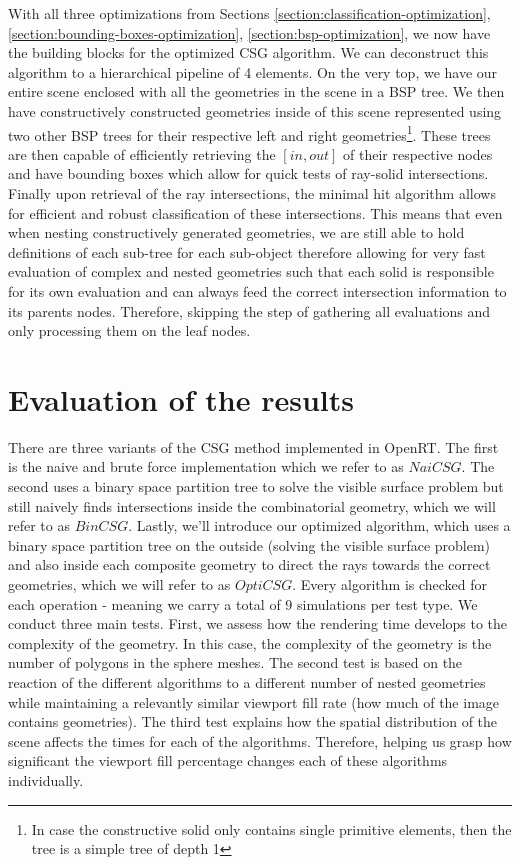 \documentclass[a4paper,11pt,oneside]{article}
\begin{document}
With all three optimizations from Sections \ref{section:classification-optimization}, \ref{section:bounding-boxes-optimization}, \ref{section:bsp-optimization}, we now have the building blocks for the optimized CSG algorithm. We can deconstruct this algorithm to a hierarchical pipeline of 4 elements. On the very top, we have our entire scene enclosed with all the geometries in the scene in a BSP tree. We then have constructively constructed geometries inside of this scene represented using two other BSP trees for their respective left and right geometries\footnote{In case the constructive solid only contains single primitive elements, then the tree is a simple tree of depth 1}. These trees are then capable of efficiently retrieving the $[in, out]$ of their respective nodes and have bounding boxes which allow for quick tests of ray-solid intersections. Finally upon retrieval of the ray intersections, the minimal hit algorithm allows for efficient and robust classification of these intersections. This means that even when nesting constructively generated geometries, we are still able to hold definitions of each sub-tree for each sub-object therefore allowing for very fast evaluation of complex and nested geometries such that each solid is responsible for its own evaluation and can always feed the correct intersection information to its parents nodes. Therefore, skipping the step of gathering all evaluations and only processing them on the leaf nodes.

\section{Evaluation of the results}

There are three variants of the CSG method implemented in OpenRT. The first is the naive and brute force implementation which we refer to as $NaiCSG$. The second uses a binary space partition tree to solve the visible surface problem but still naively finds intersections inside the combinatorial geometry, which we will refer to as $BinCSG$. Lastly, we'll introduce our optimized algorithm, which uses a binary space partition tree on the outside (solving the visible surface problem) and also inside each composite geometry to direct the rays towards the correct geometries, which we will refer to as $OptiCSG$. Every algorithm is checked for each operation - meaning we carry a total of 9 simulations per test type. We conduct three main tests. First, we assess how the rendering time develops to the complexity of the geometry. In this case, the complexity of the geometry is the number of polygons in the sphere meshes. The second test is based on the reaction of the different algorithms to a different number of nested geometries while maintaining a relevantly similar viewport fill rate (how much of the image contains geometries). The third test explains how the spatial distribution of the scene affects the times for each of the algorithms. Therefore, helping us grasp how significant the viewport fill percentage changes each of these algorithms individually.
\end{document}
